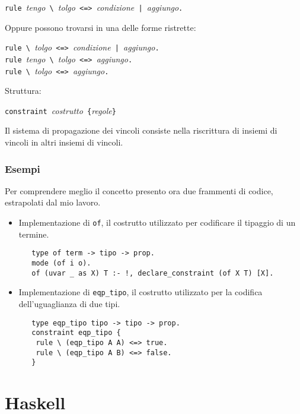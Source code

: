 \documentclass[12pt,a4paper,openright,twoside]{report}
\begin{document}
\begin{description}
 \begin{center}
  \verb"rule "\textit{tengo}\verb" \ "\textit{tolgo}\verb" <=> "\textit{condizione}\verb" | "\textit{aggiungo}\verb"."
 \end{center}
 Oppure possono trovarsi in una delle forme ristrette:
 \begin{center}
  \verb"rule \ "\textit{tolgo}\verb" <=> "\textit{condizione}\verb" | "\textit{aggiungo}\verb"."\\
  \verb"rule "\textit{tengo}\verb" \ "\textit{tolgo}\verb" <=> "\textit{aggiungo}\verb"."\\
  \verb"rule \ "\textit{tolgo}\verb" <=> "\textit{aggiungo}\verb"."\\
 \end{center}
 Struttura:
 \begin{center}
  \verb"constraint "\textit{costrutto}\verb" {"\textit{regole}\verb"}"
 \end{center}
\end{description}

Il sistema di propagazione dei vincoli consiste nella riscrittura di insiemi di vincoli in altri insiemi di vincoli.

\subsubsection{Esempi}
Per comprendere meglio il concetto presento ora due frammenti di codice, estrapolati dal mio lavoro.\\
\begin{itemize}
 \item Implementazione di \verb"of", il costrutto utilizzato per codificare il tipaggio di un termine.
  \begin{verbatim}
   type of term -> tipo -> prop.
   mode (of i o).
   of (uvar _ as X) T :- !, declare_constraint (of X T) [X].
  \end{verbatim}
 \item Implementazione di \verb"eqp_tipo", il costrutto utilizzato per la codifica dell'uguaglianza di due tipi.
  \begin{verbatim}
   type eqp_tipo tipo -> tipo -> prop.
   constraint eqp_tipo {
    rule \ (eqp_tipo A A) <=> true.
    rule \ (eqp_tipo A B) <=> false.
   }
  \end{verbatim}
\end{itemize}

\section{Haskell}
\end{document}
